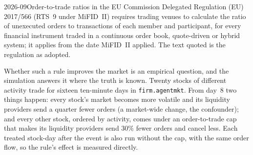 \begin{dated}{2026-09}{Order-to-trade ratios in the EU}\label{dat:mx:market-quality-and-regulation:otr}
Commission Delegated Regulation (EU) 2017/566 (RTS~9 under MiFID~II) requires trading venues to calculate the ratio of unexecuted orders to transactions
of each member and participant, for every financial instrument traded in a continuous order book, quote-driven or hybrid system; it applies from the
date MiFID~II applied. The text quoted is the regulation as adopted.
\end{dated}

Whether such a rule improves the market is an empirical question, and the simulation answers it where the truth is known. Twenty stocks of
different activity trade for sixteen ten-minute days in \texttt{firm.agentmkt}. From day~8 two things happen: every stock's market becomes more
volatile and its liquidity providers send a quarter fewer orders (a market-wide change, the confounder); and every other stock, ordered by activity,
comes under an order-to-trade cap that makes its liquidity providers send 30\% fewer orders and cancel less. Each treated stock-day after the event is
also run without the cap, with the same order flow, so the rule's effect is measured directly.

\begin{omfigure}

\label{fig:mx:market-quality-and-regulation:daily}
\end{omfigure}

